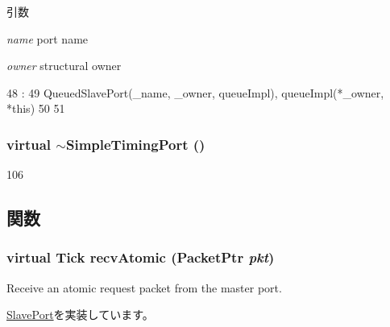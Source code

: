 \begin{DoxyParams}{引数}
\item[{\em name}]port name \item[{\em owner}]structural owner \end{DoxyParams}



\begin{DoxyCode}
48                                                       :
49     QueuedSlavePort(_name, _owner, queueImpl), queueImpl(*_owner, *this)
50 {
51 }

\end{DoxyCode}
\hypertarget{classSimpleTimingPort_a4a2041c97513fa07a0941771519c951d}{
\subsubsection[{$\sim$SimpleTimingPort}]{\setlength{\rightskip}{0pt plus 5cm}virtual $\sim${\bf SimpleTimingPort} ()}}
\label{classSimpleTimingPort_a4a2041c97513fa07a0941771519c951d}



\begin{DoxyCode}
106 { }
\end{DoxyCode}


\subsection{関数}
\hypertarget{classSimpleTimingPort_a428ab07671bc9372dc44a2487b12a726}{
\subsubsection[{recvAtomic}]{\setlength{\rightskip}{0pt plus 5cm}virtual {\bf Tick} recvAtomic ({\bf PacketPtr} {\em pkt})}}
\label{classSimpleTimingPort_a428ab07671bc9372dc44a2487b12a726}
Receive an atomic request packet from the master port. 

\hyperlink{classSlavePort_a428ab07671bc9372dc44a2487b12a726}{SlavePort}を実装しています。


